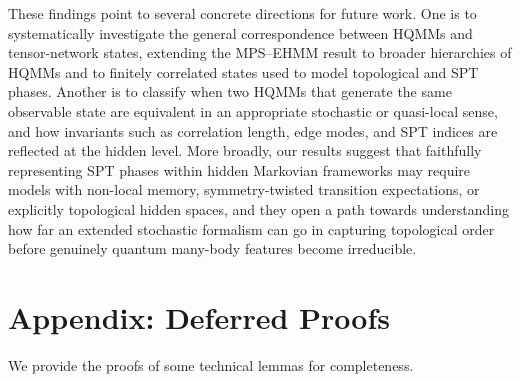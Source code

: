 \documentclass[11pt,a4paper]{article}
\begin{document}
These findings point to several concrete directions for future work. One is to systematically investigate the general correspondence between HQMMs and tensor-network states, extending the MPS–EHMM result to broader hierarchies of HQMMs and to finitely correlated states used to model topological and SPT phases. Another is to classify when two HQMMs that generate the same observable state are equivalent in an appropriate stochastic or quasi-local sense, and how invariants such as correlation length, edge modes, and SPT indices are reflected at the hidden level. More broadly, our results suggest that faithfully representing SPT phases within hidden Markovian frameworks may require models with non-local memory, symmetry-twisted transition expectations, or explicitly topological hidden spaces, and they open a path towards understanding how far an extended stochastic formalism can go in capturing topological order before genuinely quantum many-body features become irreducible.




%

\appendix
\section{Appendix: Deferred Proofs}\label{app:B}

We provide the proofs of some technical lemmas for completeness.

\end{document}
